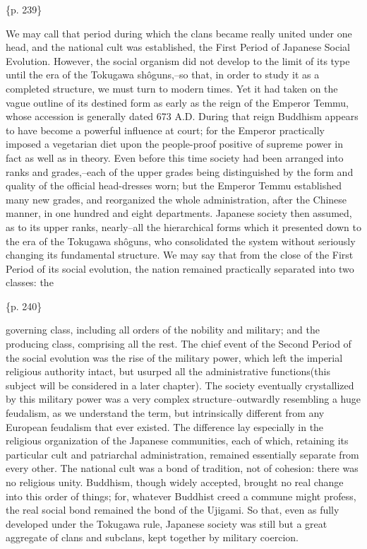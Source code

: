 \{p. 239\}

We may call that period during which the clans became really united under one head, and the national cult was established, the First Period of Japanese Social Evolution. However, the social organism did not develop to the limit of its type until the era of the Tokugawa shôguns,--so that, in order to study it as a completed structure, we must turn to modern times. Yet it had taken on the vague outline of its destined form as early as the reign of the Emperor Temmu, whose accession is generally dated 673 A.D. During that reign Buddhism appears to have become a powerful influence at court; for the Emperor practically imposed a vegetarian diet upon the people-proof positive of supreme power in fact as well as in theory. Even before this time society had been arranged into ranks and grades,--each of the upper grades being distinguished by the form and quality of the official head-dresses worn; but the Emperor Temmu established many new grades, and reorganized the whole administration, after the Chinese manner, in one hundred and eight departments. Japanese society then assumed, as to its upper ranks, nearly--all the hierarchical forms which it presented down to the era of the Tokugawa shôguns, who consolidated the system without seriously changing its fundamental structure. We may say that from the close of the First Period of its social evolution, the nation remained practically separated into two classes: the

\{p. 240\}

governing class, including all orders of the nobility and military; and the producing class, comprising all the rest. The chief event of the Second Period of the social evolution was the rise of the military power, which left the imperial religious authority intact, but usurped all the administrative functions(this subject will be considered in a later chapter). The society eventually crystallized by this military power was a very complex structure--outwardly resembling a huge feudalism, as we understand the term, but intrinsically different from any European feudalism that ever existed. The difference lay especially in the religious organization of the Japanese communities, each of which, retaining its particular cult and patriarchal administration, remained essentially separate from every other. The national cult was a bond of tradition, not of cohesion: there was no religious unity. Buddhism, though widely accepted, brought no real change into this order of things; for, whatever Buddhist creed a commune might profess, the real social bond remained the bond of the Ujigami. So that, even as fully developed under the Tokugawa rule, Japanese society was still but a great aggregate of clans and subclans, kept together by military coercion.

